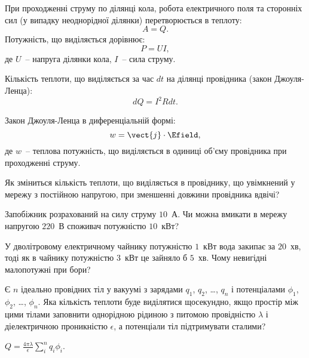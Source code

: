\begin{Theory}\small
    При проходженні струму по ділянці кола, робота електричного поля та сторонніх сил (у випадку неоднорідної ділянки) перетворюється в теплоту:
	\begin{equation} 
		A = Q.
\end{equation}
Потужність, що виділяється дорівнює:
\begin{equation} 
		P = U I,
\end{equation}		
де $U$~-- напруга ділянки кола, $I$~-- сила струму.

Кількість теплоти, що виділяється за час $dt$ на ділянці провідника (закон Джоуля-Ленца):
\begin{equation} 
	dQ = I^2 R dt.
\end{equation}
  	
Закон Джоуля-Ленца в диференціальній формі:
\begin{equation} 
w = \vect{j}\cdot\Efield,
\end{equation}
де $w$~-- теплова потужність, що виділяється в одиниці об'єму провідника при проходженні струму.		
\end{Theory}

\begin{problem}
    Як зміниться кількість теплоти, що виділяється в провіднику, що увімкнений у мережу з постійною напругою, при зменшенні довжини провідника вдвічі?
\end{problem}

\begin{problem}
    Запобіжник розрахований на силу струму $10$~А. Чи можна вмикати в мережу напругою $220$~В споживач потужністю $10$~кВт?
\end{problem}


\begin{problem}
    У дволітровому електричному чайнику потужністю $1$~кВт вода закипає за $20$~хв, тоді як в чайнику потужністю $3$~кВт це зайняло б $5$~хв. Чому невигідні малопотужні при бори?
\end{problem}


\begin{problem}%
Є $n$ ідеально провідних тіл у вакуумі з зарядами $q_1$, $q_2$, \ldots, $q_n$ і потенціалами $\phi_1$, $\phi_2$, \ldots, $\phi_n$. Яка кількість теплоти буде виділятися щосекундно, якщо простір між цими тілами заповнити однорідною рідиною з питомою провідністю $\lambda$ і діелектричною проникністю $\epsilon$, а потенціали тіл підтримувати сталими?
\begin{solution}
	$Q = \frac{4\pi\lambda}{\epsilon}\sum\limits_i^n q_i\phi_i$.
\end{solution}
\end{problem}

